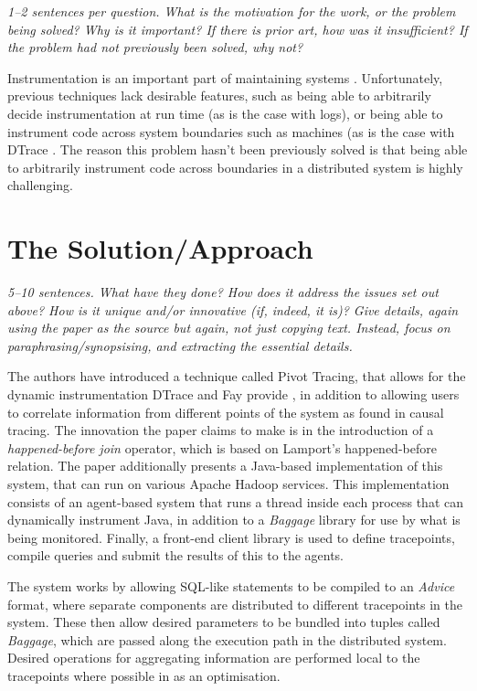 \documentclass[11pt]{article}
\begin{document}
\textsl{1--2 sentences per question. What is the motivation for the work, or
the problem being solved? Why is it important? If there is prior art, how was
it insufficient? If the problem had not previously been solved, why not?}

Instrumentation is an important part of maintaining systems
\cite{InstrumentationImportance}. Unfortunately, previous techniques lack
desirable features, such as being able to arbitrarily decide instrumentation at
run time (as is the case with logs), or being able to instrument code across
system boundaries such as machines (as is the case with DTrace \cite{DTrace}.
The reason this problem hasn't been previously solved is that being able to
arbitrarily instrument code across boundaries in a distributed system is highly
challenging.


\section*{The Solution/Approach}

\textsl{5--10 sentences. What have they done? How does it address the issues
set out above? How is it unique and/or innovative (if, indeed, it is)? Give
details, again using the paper as the source but again, not just copying text.
Instead, focus on paraphrasing/synopsising, and extracting the essential
details.}

The authors have introduced a technique called Pivot Tracing, that allows for
the dynamic instrumentation DTrace and Fay provide \cite{DTrace}, in addition
to allowing users to correlate information from different points of the system
as found in causal tracing. The innovation the paper claims to make is in the
introduction of a \textit{happened-before join} operator, which is based on
Lamport's happened-before relation. The paper additionally presents a
Java-based implementation of this system, that can run on various Apache Hadoop
\cite{Hadoop} services. This implementation consists of an agent-based system
that runs a thread inside each process that can dynamically instrument Java, in
addition to a \textit{Baggage} library for use by what is being monitored.
Finally, a front-end client library is used to define tracepoints, compile
queries and submit the results of this to the agents.

The system works by allowing SQL-like statements to be compiled to an
\textit{Advice} format, where separate components are distributed to different
tracepoints in the system. These then allow desired parameters to be bundled
into tuples called \textit{Baggage}, which are passed along the execution path
in the distributed system. Desired operations for aggregating information are
performed local to the tracepoints where possible in as an optimisation.
\end{document}
